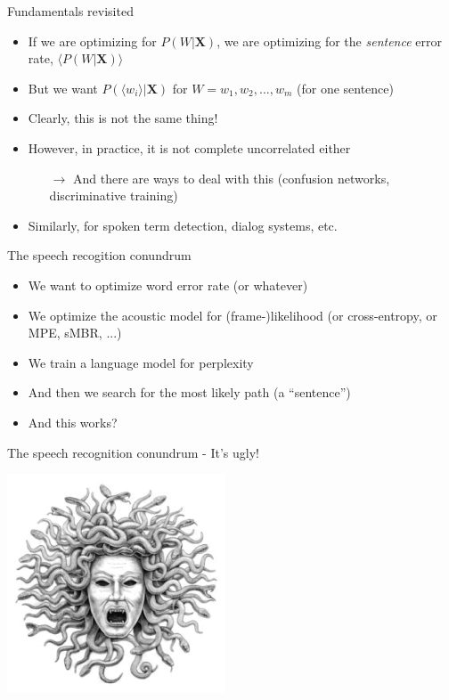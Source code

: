 \begin{frame}{Fundamentals revisited}
  \begin{itemize}
  \item If we are optimizing for $P(W|\boldsymbol{X})$,
    we are optimizing for the \textit{sentence} error rate, $\langle P(W|\boldsymbol{X}) \rangle$
  \item But we want $P(\langle w_i \rangle|\boldsymbol{X})$ for $W=w_1,w_2, ..., w_m$ (for one sentence)
  \item Clearly, this is not the same thing!
  \item However, in practice, it is not complete uncorrelated either
    \begin{itemize}
    \item[$\rightarrow$] And there are ways to deal with this (confusion networks, discriminative training)
    \end{itemize}
  \item Similarly, for spoken term detection, dialog systems, etc.
  \end{itemize}
\end{frame}

\begin{frame}{The speech recogition conundrum}
  \begin{itemize}
  \item We want to optimize word error rate (or whatever)\\
    \vspace{1cm}
  \item We optimize the acoustic model for (frame-)likelihood (or cross-entropy, or MPE, sMBR, ...)
  \item We train a language model for perplexity
  \item And then we search for the most likely path (a ``sentence'')
  \item And this works?
  \end{itemize}
\end{frame}

\begin{frame}{The speech recognition conundrum - It's ugly!}
  \begin{center}
    \includegraphics[height=65mm]{figures/medusa}
  \end{center}
\end{frame}

